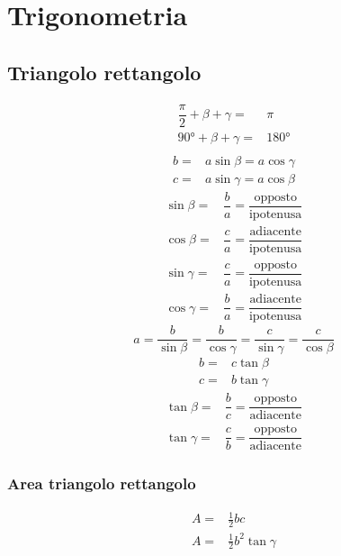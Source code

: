 \chapter{Trigonometria}
\section{Triangolo rettangolo}
{\centering
	
	\par}
\begin{align*}
\dfrac{\pi}{2}+\beta+\gamma=&\pi\\
\ang{90}+\beta+\gamma=&\ang{180}\\
\end{align*}
\begin{align*}
b=&a\sin\beta=a\cos\gamma\\
c=&a\sin\gamma=a\cos\beta
\end{align*}
\begin{align*}
\sin\beta=&\dfrac{b}{a}=\dfrac{\text{opposto}}{\text{ipotenusa}}\\
\cos\beta=&\dfrac{c}{a}=\dfrac{\text{adiacente}}{\text{ipotenusa}}\\
\sin\gamma=&\dfrac{c}{a}=\dfrac{\text{opposto}}{\text{ipotenusa}}\\
\cos\gamma=&\dfrac{b}{a}=\dfrac{\text{adiacente}}{\text{ipotenusa}}
\end{align*}
\begin{equation*}
a=\dfrac{b}{\sin\beta}=\dfrac{b}{\cos\gamma}=\dfrac{c}{\sin\gamma}=\dfrac{c}{\cos\beta}
\end{equation*}
\begin{align*}
b=&c\tan\beta\\
c=&b\tan\gamma
\end{align*}
\begin{align*}
\tan\beta=&\dfrac{b}{c}=\dfrac{\text{opposto}}{\text{adiacente}}\\
\tan\gamma=&\dfrac{c}{b}=\dfrac{\text{opposto}}{\text{adiacente}}
\end{align*}
\subsection{Area triangolo rettangolo}
\begin{align*}
A=&\frac{1}{2}bc\\
A=&\frac{1}{2}b^2\tan\gamma\\
\end{align*}
